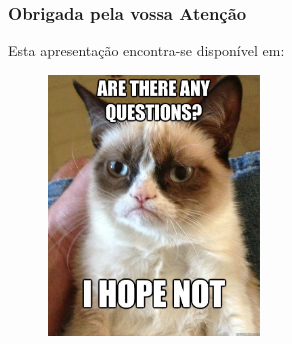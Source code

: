 \documentclass[hyperref={pdfpagelabels=true}]{beamer}
\begin{document}
\begin{frame}
\frametitle{Obrigada pela vossa Aten\c{c}\~{a}o}
    Esta apresenta\c{c}\~{a}o encontra-se dispon\'{i}vel em: 
    \begin{figure}   
      \includegraphics[width=0.5\textwidth]{cat.jpg}      
    \end{figure}   
    
\end{frame}


\end{document}
